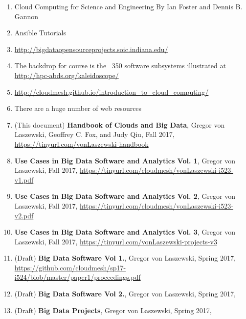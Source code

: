 \begin{enumerate}
\item Cloud Computing for Science and Engineering By Ian Foster and
  Dennis
  B. Gannon
\item Ansible Tutorials
\item	\url{http://bigdataopensourceprojects.soic.indiana.edu/}
\item The backdrop for course is the ~350 software subsystems
  illustrated at \url{http://hpc-abds.org/kaleidoscope/}
\item	\url{http://cloudmesh.github.io/introduction_to_cloud_computing/}
\item	There are a huge number of web resources

\item (This document) {\bf Handbook of Clouds and Big Data}, Gregor von Laszewski,
  Geoffrey C. Fox, and Judy Qiu, Fall 2017,
  \url{https://tinyurl.com/vonLaszewski-handbook}

\item {\bf Use Cases in Big Data Software and
  Analytics Vol. 1}, Gregor von Laszewski, Fall 2017,
  \url{https://tinyurl.com/cloudmesh/vonLaszewski-i523-v1.pdf}

\item {\bf Use Cases in Big Data Software and
  Analytics Vol. 2}, Gregor von Laszewski, Fall 2017, \url{https://tinyurl.com/cloudmesh/vonLaszewski-i523-v2.pdf}

\item  {\bf Use Cases in Big Data Software and
  Analytics Vol. 3}, Gregor von Laszewski, Fall 2017, 
  \url{https://tinyurl.com/vonLaszewski-projects-v3}

\item (Draft) {\bf Big Data Software Vol 1.}, Gregor von Laszewski, Spring 2017,
\url{https://github.com/cloudmesh/sp17-i524/blob/master/paper1/proceedings.pdf}

\item (Draft) {\bf Big Data Software Vol 2.}, Gregor von Laszewski, Spring 2017,

\item (Draft) {\bf Big Data Projects}, Gregor von Laszewski, Spring 2017,

\end{enumerate}

